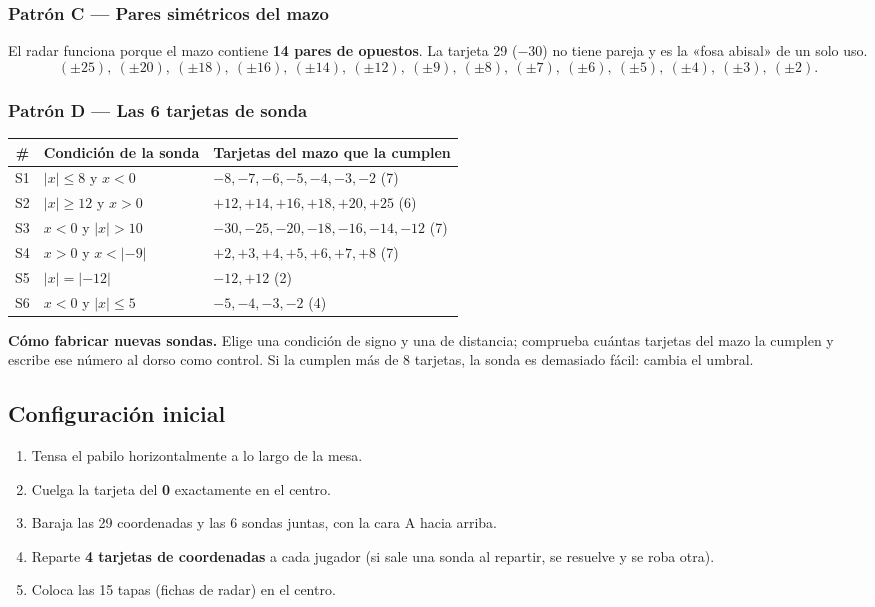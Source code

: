 \documentclass[12pt, letterpaper]{article}
\newcommand{\abs}[1]{\lvert #1\rvert}
\begin{document}
\subsubsection{Patrón C — Pares simétricos del mazo}

El radar funciona porque el mazo contiene \textbf{14 pares de opuestos}. La tarjeta 29 ($-30$) no tiene pareja y es la «fosa abisal» de un solo uso.
\[
(\pm 25),\ (\pm 20),\ (\pm 18),\ (\pm 16),\ (\pm 14),\ (\pm 12),\ (\pm 9),\ (\pm 8),\ (\pm 7),\ (\pm 6),\ (\pm 5),\ (\pm 4),\ (\pm 3),\ (\pm 2).
\]

\subsubsection{Patrón D — Las 6 tarjetas de sonda}

\begin{center}
\small
\begin{tabular}{@{}c p{6.2cm} p{6.6cm}@{}}
\toprule
\textbf{\#} & \textbf{Condición de la sonda} & \textbf{Tarjetas del mazo que la cumplen}\\
\midrule
S1 & $\abs{x}\le 8$ y $x<0$ & $-8,-7,-6,-5,-4,-3,-2$ (7)\\
S2 & $\abs{x}\ge 12$ y $x>0$ & $+12,+14,+16,+18,+20,+25$ (6)\\
S3 & $x<0$ y $\abs{x}>10$ & $-30,-25,-20,-18,-16,-14,-12$ (7)\\
S4 & $x>0$ y $x<\abs{-9}$ & $+2,+3,+4,+5,+6,+7,+8$ (7)\\
S5 & $\abs{x}=\abs{-12}$ & $-12,+12$ (2)\\
S6 & $x<0$ y $\abs{x}\le 5$ & $-5,-4,-3,-2$ (4)\\
\bottomrule
\end{tabular}
\end{center}

\begin{cuadroadvertencia}
\textbf{Cómo fabricar nuevas sondas.} Elige una condición de signo y una de distancia; comprueba cuántas tarjetas del mazo la cumplen y escribe ese número al dorso como control. Si la cumplen más de 8 tarjetas, la sonda es demasiado fácil: cambia el umbral.
\end{cuadroadvertencia}

\subsection{Configuración inicial}

\begin{enumerate}[leftmargin=*]
  \item Tensa el pabilo horizontalmente a lo largo de la mesa.
  \item Cuelga la tarjeta del \textbf{0} exactamente en el centro.
  \item Baraja las 29 coordenadas y las 6 sondas juntas, con la cara A hacia arriba.
  \item Reparte \textbf{4 tarjetas de coordenadas} a cada jugador (si sale una sonda al repartir, se resuelve y se roba otra).
  \item Coloca las 15 tapas (fichas de radar) en el centro.
\end{enumerate}
\end{document}
